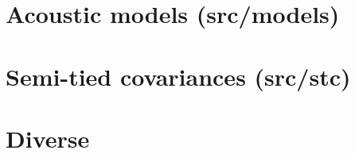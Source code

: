 \section{Acoustic models (src/models)}












































\section{Semi-tied covariances (src/stc)}




\section{Diverse}



